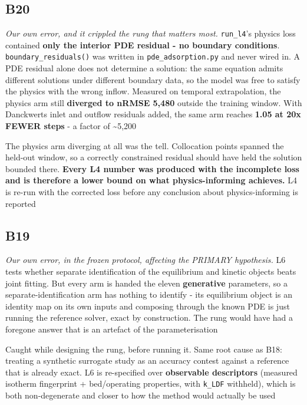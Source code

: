 \documentclass[10pt]{article}
\begin{document}
\subsection*{B20}\label{led:B20}
\begin{description}[leftmargin=0pt,itemsep=1pt]
\item[Defect.] \emph{Our own error, and it crippled the rung that matters most.} \texttt{run\_l4}'s physics loss contained \textbf{only the interior PDE residual - no boundary conditions}. \texttt{boundary\_residuals()} was written in \texttt{pde\_adsorption.py} and never wired in. A PDE residual alone does not determine a solution: the same equation admits different solutions under different boundary data, so the model was free to satisfy the physics with the wrong inflow. Measured on temporal extrapolation, the physics arm still \textbf{diverged to nRMSE 5,480} outside the training window. With Danckwerts inlet and outflow residuals added, the same arm reaches \textbf{1.05 at 20x FEWER steps} - a factor of \textasciitilde{}5,200
\item[How it was caught.] The physics arm diverging at all was the tell. Collocation points spanned the held-out window, so a correctly constrained residual should have held the solution bounded there. \textbf{Every L4 number was produced with the incomplete loss and is therefore a lower bound on what physics-informing achieves.} L4 is re-run with the corrected loss before any conclusion about physics-informing is reported
\end{description}
\subsection*{B19}\label{led:B19}
\begin{description}[leftmargin=0pt,itemsep=1pt]
\item[Defect.] \emph{Our own error, in the frozen protocol, affecting the PRIMARY hypothesis.} L6 tests whether separate identification of the equilibrium and kinetic objects beats joint fitting. But every arm is handed the eleven \textbf{generative} parameters, so a separate-identification arm has nothing to identify - its equilibrium object is an identity map on its own inputs and composing through the known PDE is just running the reference solver, exact by construction. The rung would have had a foregone answer that is an artefact of the parameterisation
\item[How it was caught.] Caught while designing the rung, before running it. Same root cause as B18: treating a synthetic surrogate study as an accuracy contest against a reference that is already exact. L6 is re-specified over \textbf{observable descriptors} (measured isotherm fingerprint + bed/operating properties, with \texttt{k\_LDF} withheld), which is both non-degenerate and closer to how the method would actually be used
\end{description}
\end{document}

